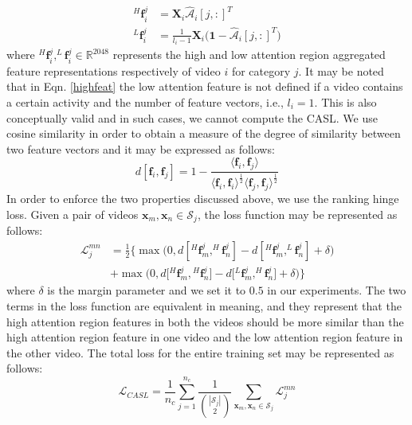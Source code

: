 \documentclass[runningheads]{llncs}
\begin{document}
\begin{align}
^H\boldsymbol{\boldsymbol{f}}_i^j &= \boldsymbol{X}_i \boldsymbol{\hat{\mathcal{A}}}_i[j,:]^T \nonumber \\
^L\boldsymbol{\boldsymbol{f}}_i^j &= \frac{1}{l_i-1} \boldsymbol{X}_i \Big(\boldsymbol{1}-\boldsymbol{\hat{\mathcal{A}}}_i[j,:]^T\Big)
\label{highfeat} 
\end{align}
where $^H\boldsymbol{\boldsymbol{f}}_i^j, ^L\boldsymbol{\boldsymbol{f}}_i^j \in \mathbb{R}^{2048}$ represents the high and low attention region aggregated feature representations respectively of video $i$ for category $j$. It may be noted that in Eqn. \ref{highfeat} the low attention feature is not defined if a video contains a certain activity and the number of feature vectors, i.e., $l_i=1$. This is also conceptually valid and in such cases, we cannot compute the CASL. We use cosine similarity in order to obtain a measure of the degree of similarity between two feature vectors and it may be expressed as follows:
\begin{equation}
d[\boldsymbol{f}_i,\boldsymbol{f}_j] = 1 - \frac{\langle \boldsymbol{f}_i,\boldsymbol{f}_j \rangle}{\langle\boldsymbol{f}_i,\boldsymbol{f}_i\rangle^{\frac{1}{2}}\langle\boldsymbol{f}_j,\boldsymbol{f}_j\rangle^{\frac{1}{2}}}
\label{cosine}
\end{equation}
In order to enforce the two properties discussed above, we use the ranking hinge loss. Given a pair of videos $\boldsymbol{x}_m, \boldsymbol{x}_n \in \mathcal{S}_j$, the loss function may be represented as follows:
\begin{align}
\mathcal{L}^{mn}_j &= \frac{1}{2}\Big\{\max\Big(0, d[ ^H\boldsymbol{\boldsymbol{f}}_m^j, ^H\boldsymbol{\boldsymbol{f}}_n^j] - d[ ^H\boldsymbol{\boldsymbol{f}}_m^j, ^L\boldsymbol{\boldsymbol{f}}_n^j] + \delta\Big) \nonumber \\
&+ \max\Big(0, d\big[ {}^H \boldsymbol{\boldsymbol{f}}_m^j, {}^H \boldsymbol{\boldsymbol{f}}_n^j\big] - d\big[  {}^L\boldsymbol{\boldsymbol{f}}_m^j, ^H\boldsymbol{\boldsymbol{f}}_n^j\big] + \delta\Big)\Big\}
\label{pairloss}
\end{align}
where $\delta$ is the margin parameter and we set it to $0.5$ in our experiments. The two terms in the loss function are equivalent in meaning, and they represent that the high attention region features in both the videos should be more similar than the high attention region feature in one video and the low attention region feature in the other video. The total loss for the entire training set may be represented as follows:
\begin{equation}
\mathcal{L}_{CASL} = \frac{1}{n_c}\sum_{j=1}^{n_c} \frac{1}{{|\mathcal{S}_j| \choose 2}} \sum_{\boldsymbol{x}_m, \boldsymbol{x}_n \in \mathcal{S}_j} \mathcal{L}^{mn}_j
\label{col}
\end{equation}
\end{document}
